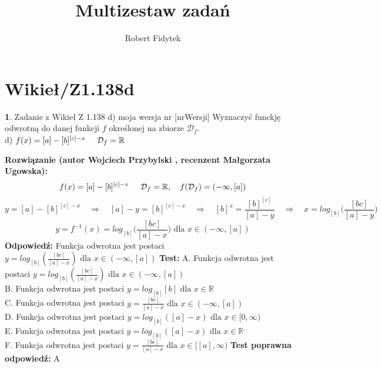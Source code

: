 \documentclass[12pt, a4paper]{article}
\title{Multizestaw zadań}
\author{Robert Fidytek}
\date{}
\theoremstyle{definition} %
\newtheorem{zad}{}
\newcommand{\kategoria}[1]{\section{#1}} %
\newcommand{\zadStart}[1]{\begin{zad}#1\newline} %
\newcommand{\zadStop}{\end{zad}}   %
\newcommand{\rozwStart}[2]{\noindent \textbf{Rozwiązanie (autor #1 , recenzent #2): }\newline} %
\newcommand{\rozwStop}{\newline}                                            %
\newcommand{\odpStart}{\noindent \textbf{Odpowiedź:}\newline}    %
\newcommand{\odpStop}{\newline}                                             %
\newcommand{\testStart}{\noindent \textbf{Test:}\newline} %
\newcommand{\testStop}{\newline} %
\newcommand{\kluczStart}{\noindent \textbf{Test poprawna odpowiedź:}\newline} %
\newcommand{\kluczStop}{\newline} %
\begin{document}
\maketitle


\kategoria{Wikieł/Z1.138d}
\zadStart{Zadanie z Wikieł Z 1.138 d) moja wersja nr [nrWersji]}
Wyznaczyć funckję odwrotną do danej funkcji $f$ określonej na zbiorze $\mathcal{D}_{f}$.\\
d) $f(x)=[a]-[b]^{[c]-x}\hspace{5mm}\mathcal{D}_{f}=\mathbb{R}$
\zadStop
\rozwStart{Wojciech Przybylski}{Małgorzata Ugowska}
$$f(x)=[a]-[b]^{[c]-x}\hspace{5mm} \mathcal{D}_{f}=\mathbb{R}, \quad f(\mathcal{D}_{f})=(-\infty,[a])$$
$$y=[a]-[b]^{[c]-x} \quad \Rightarrow \quad [a]-y=[b]^{[c]-x} \quad \Rightarrow \quad [b]^{x}=\frac{[b]^{[c]}}{[a]-y} \quad \Rightarrow \quad x=log_{[b]}\Big(\frac{[bc]}{[a]-y}\Big)$$
$$y=f^{-1}(x)=log_{[b]}\Big(\frac{[bc]}{[a]-x}\Big) \mbox{ dla } x\in (-\infty,[a])$$
\rozwStop
\odpStart
Funkcja odwrotna jest postaci $y=log_{[b]}(\frac{[bc]}{[a]-x}) \mbox{ dla }x\in (-\infty,[a])$
\odpStop
\testStart
A. Funkcja odwrotna jest postaci $y=log_{[b]}(\frac{[bc]}{[a]-x})  \mbox{ dla }x\in(-\infty,[a])$\\
B. Funkcja odwrotna jest postaci $y=log_{[b]}{[b]} \mbox{ dla }x\in\mathbb{R}$\\
C. Funkcja odwrotna jest postaci $y=\frac{[bc]}{[a]-x}  \mbox{ dla }x\in(-\infty,[a])$\\
D. Funkcja odwrotna jest postaci $y=log_{[b]}([a]-x)  \mbox{ dla }x\in[0,\infty)$\\
E. Funkcja odwrotna jest postaci $y=log_{[b]}([a]-x) \mbox{ dla }x\in \mathbb{R}$\\
F. Funkcja odwrotna jest postaci $y=\frac{[bc]}{[a]-x}\mbox{ dla }x\in[[a],\infty)$
\testStop
\kluczStart
A
\kluczStop
\end{document}
